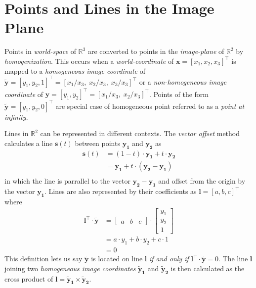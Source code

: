 \section{Points and Lines in the Image Plane}

\par Points in \textit{world-space} of $\mathbb{R}^3$ are converted to points in the \textit{image-plane} of $\mathbb{R}^2$ by \textit{homogenization}. This occurs when a \textit{world-coordinate} of $\mathbf{x}=[x_1,x_2,x_3]^\intercal$ is mapped to a \textit{homogeneous image coordinate} of $\mathbf{\tilde{y}}=[y_1,y_2,1]^\intercal=[x_1/x_3,\;x_2/x_3,\;x_3/x_3]^\intercal$ or a \textit{non-homogeneous image coordinate} of $\mathbf{y}=[y_1,y_2]^\intercal=[x_1/x_3,\;x_2/x_3]^\intercal$. Points of the form $\mathbf{\tilde{y}}=[y_1,y_2,0]^\intercal$ are special case of homogeneous point referred to as a \textit{point at infinity}.

\par Lines in $\mathbb{R}^2$ can be represented in different contexts. The \textit{vector offset} method calculates a line $\mathbf{s}(t)$ between points $\mathbf{y_1}$ and $\mathbf{y_2}$ as 
\begin{equation*}
\begin{split}
\mathbf{s}(t)&=(1-t)\cdot\mathbf{y_1}+t\cdot\mathbf{y_2}\\
&=\mathbf{y_1}+t\cdot(\mathbf{y_2}-\mathbf{y_1})\\
\end{split}
\end{equation*}
in which the line is parrallel to the vector $\mathbf{y_2}-\mathbf{y_1}$ and offset from the  origin by the vector $\mathbf{y_1}$. Lines are also represented by their coefficients as $\mathbf{l}=[a,b,c]^\intercal$ where
\begin{equation*}
\begin{split}
\mathbf{l}^\intercal\cdot\mathbf{\tilde{y}}&=\left[\begin{array}{ccc}a & b & c\end{array}\right]\cdot\left[\begin{array}{c}y_1\\y_2\\1\end{array}\right]\\
&=a\cdot{y_1}+b\cdot{y_2}+c\cdot{1}\\
&=0
\end{split}
\end{equation*}
This definition lets us say $\mathbf{\tilde{y}}$ is located on line $\mathbf{l}$ \textit{if and only if} $\mathbf{l}^\intercal\cdot\mathbf{\tilde{y}}=0$. The line $\mathbf{l}$ joining two \textit{homogeneous image coordinates} $\mathbf{\tilde{y}_1}$ and $\mathbf{\tilde{y}_2}$ is then calculated as the cross product of $\mathbf{l}=\mathbf{\tilde{y}_1}\times\mathbf{\tilde{y}_2}$. 

